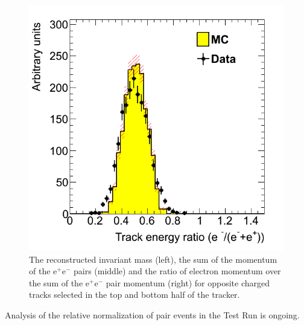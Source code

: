 \begin{figure}[ht]
   \includegraphics[scale=0.25]{test2012/vertexing/figures/h_ratioEsum_h_ratioEsum_dataMC_trigseltwotrksel4hit_recoilmc_twotrkfilt.png}
\caption{\small{The reconstructed invariant mass (left), the sum of the momentum of the  e$^+$e$^-$ pairs (middle) and the ratio of electron momentum over the sum of the e$^+$e$^-$ pair momentum (right) for opposite charged tracks selected in the top and bottom half of the tracker.}} 
\label{fig:pair_kin}
\end{figure}
Analysis of the relative normalization of pair events in the Test Run is ongoing.

